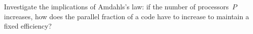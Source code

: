   Investigate the implications of Amdahls's law: if the number of
  processors~$P$ increases, how does the parallel fraction of a code
  have to increase to maintain a fixed efficiency?
